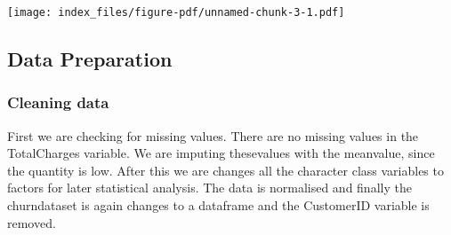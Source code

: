 \documentclass[
  letterpaper,
  DIV=11,
  numbers=noendperiod]{scrartcl}
\newenvironment{Shaded}{\begin{snugshade}}{\end{snugshade}}
\newcommand{\AttributeTok}[1]{\textcolor[rgb]{0.40,0.45,0.13}{#1}}
\newcommand{\CommentTok}[1]{\textcolor[rgb]{0.37,0.37,0.37}{#1}}
\newcommand{\FunctionTok}[1]{\textcolor[rgb]{0.28,0.35,0.67}{#1}}
\newcommand{\NormalTok}[1]{\textcolor[rgb]{0.00,0.23,0.31}{#1}}
\newcommand{\SpecialCharTok}[1]{\textcolor[rgb]{0.37,0.37,0.37}{#1}}
\newcommand{\StringTok}[1]{\textcolor[rgb]{0.13,0.47,0.30}{#1}}
\begin{document}
\begin{Shaded}
\end{Shaded}

\texttt{[image: index\_files/figure-pdf/unnamed-chunk-3-1.pdf]}

\subsection{Data Preparation}\label{data-preparation}

\subsubsection{Cleaning data}\label{cleaning-data}

First we are checking for missing values. There are no missing values in
the TotalCharges variable. We are imputing thesevalues with the
meanvalue, since the quantity is low. After this we are changes all the
character class variables to factors for later statistical analysis. The
data is normalised and finally the churndataset is again changes to a
dataframe and the CustomerID variable is removed.
\end{document}
